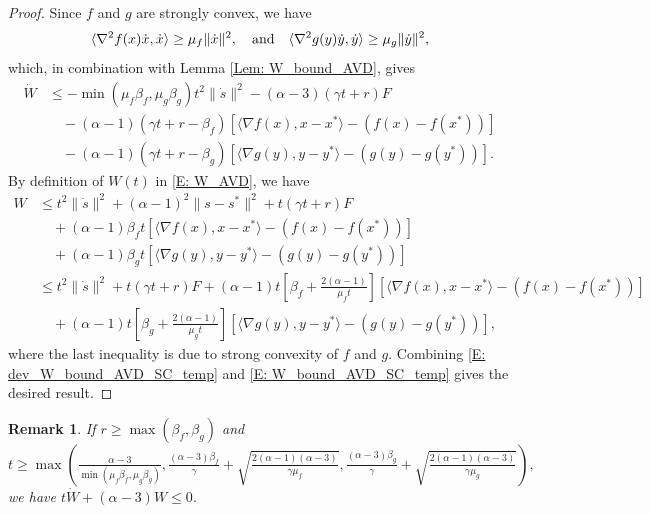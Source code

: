 \documentclass[pdflatex,sn-mathphys-num]{sn-jnl}
\theoremstyle{thmstyleone}
\theoremstyle{thmstyletwo}
\newtheorem{remark}[theorem]{Remark}
\theoremstyle{thmstylethree}
\newcommand{\qbox}[1]{\quad\hbox{#1}\quad}
\begin{document}
\begin{proof}
Since $f$ and $g$ are strongly convex, we have
$$ \langle \nabla^2 f(x) \dot{x}, \dot{x} \rangle \ge \mu_f \| \dot{x} \|^2,
\qbox{and} \langle \nabla^2 g(y) \dot{y}, \dot{y} \rangle \ge \mu_g \| \dot{y} \|^2, $$
which, in combination with Lemma \ref{Lem: W_bound_AVD}, gives
\begin{equation}\label{E: dev_W_bound_AVD_SC_temp}
\begin{aligned}
\dot{W}
&\le - \min(\mu_f\beta_f,\mu_g\beta_g)t^2 \| \dot{s} \|^2 - (\alpha-3)(\gamma t + r) F \\
&\quad -(\alpha-1)( \gamma t + r-\beta_f ) \left[\langle \nabla f(x), x-x^* \rangle - \left( f(x) - f(x^*) \right) \right] \\
&\quad -(\alpha-1)( \gamma t + r-\beta_g ) \left[ \langle \nabla g(y), y-y^* \rangle - \left( g(y) - g(y^*) \right) \right].
\end{aligned}
\end{equation}
By definition of $W(t)$ in \eqref{E: W_AVD}, we have
\begin{equation}\label{E: W_bound_AVD_SC_temp}
\begin{aligned}
W
&\le t^2 \| \dot{s} \|^2 + (\alpha-1)^2 \| s-s^* \|^2 + t(\gamma t + r) F \\ 
&\quad + (\alpha-1)\beta_f t \left[\langle \nabla f(x), x-x^* \rangle - \left( f(x) - f(x^*) \right) \right] \\
&\quad + (\alpha-1)\beta_g t \left[ \langle \nabla g(y), y-y^* \rangle - \left( g(y) - g(y^*) \right) \right] \\
&\le t^2 \| \dot{s} \|^2 + t(\gamma t + r) F 
 + (\alpha-1) t \left[ \beta_f + \frac{2(\alpha-1)}{\mu_f t} \right] \left[\langle \nabla f(x), x-x^* \rangle - \left( f(x) - f(x^*) \right) \right] \\
&\quad + (\alpha-1) t \left[ \beta_g + \frac{2(\alpha-1)}{\mu_g t} \right] \left[ \langle \nabla g(y), y-y^* \rangle - \left( g(y) - g(y^*) \right) \right],
\end{aligned}
\end{equation}
where the last inequality is due to strong convexity of $f$ and $g$. Combining \eqref{E: dev_W_bound_AVD_SC_temp} and \eqref{E: W_bound_AVD_SC_temp} gives the desired result.
\end{proof}


\begin{remark}\label{Rem: W_bound_AVD_SC}
If $r\ge \max(\beta_f,\beta_g)$ and
$$ t\ge \max\left( \tfrac{\alpha-3}{\min(\mu_f\beta_f,\mu_g\beta_g)}, \tfrac{(\alpha-3)\beta_f}{\gamma} + \sqrt{\tfrac{ 2(\alpha-1)(\alpha-3) }{\gamma\mu_f} }, \tfrac{(\alpha-3)\beta_g}{\gamma} + \sqrt{\tfrac{ 2(\alpha-1)(\alpha-3) }{\gamma\mu_g} } \right), $$
we have $t\dot{W} + (\alpha-3)W \le 0$.
\end{remark}
\end{document}
